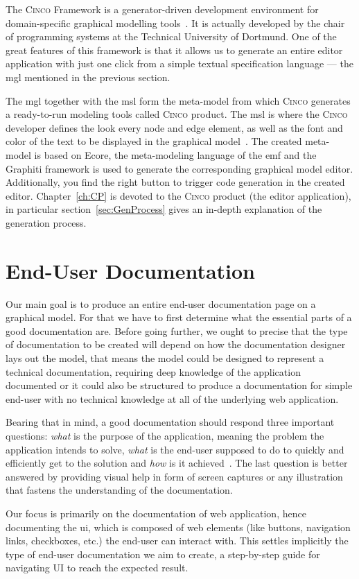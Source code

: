 The \textsc{Cinco} Framework is a generator-driven development environment for domain-specific graphical modelling tools~\cite{Cinco}. It is actually developed by the chair of programming systems at the Technical University of Dortmund. One of the great features of this framework is that it allows us to generate an entire editor application with just one click from a simple textual specification language --- the \acrfull{mgl} mentioned in the previous section. 

The \acrshort{mgl} together with the \acrshort{msl} form the meta-model from which \textsc{Cinco} generates a ready-to-run modeling tools called \textsc{Cinco} product. The \acrshort{msl} is where the \textsc{Cinco} developer defines the look every node and edge element, as well as the font and color of the text to be displayed in the graphical model~\cite{naujokat-diss}. The created meta-model is based on Ecore, the meta-modeling language of the \acrfull{emf} and the Graphiti framework is used to generate the corresponding graphical model editor. Additionally, you find the right button to trigger code generation in the created editor. Chapter~\ref{ch:CP} is devoted to the \textsc{Cinco} product (the editor application), in particular section~\ref{sec:GenProcess} gives an in-depth explanation of the generation process.



\section{End-User Documentation}\label{sec:endUserDoc}

Our main goal is to produce an entire end-user documentation page on a graphical model. For that we have to first determine what the essential parts of a good documentation are. Before going further, we ought to precise that the type of documentation to be created will depend on how the documentation designer lays out the model, that means the model could be designed to represent a technical documentation, requiring deep knowledge of the application documented or it could also be structured to produce a documentation for simple end-user with no technical knowledge at all of the underlying web application.

Bearing that in mind, a good documentation should respond three important questions: \textit{what} is the purpose of the application, meaning the problem the application intends to solve, \textit{what} is the end-user supposed to do to quickly and efficiently get to the solution and \textit{how} is it achieved~\cite{5712775}. The last question is better answered by providing visual help in form of screen captures or any illustration that fastens the understanding of the documentation.

Our focus is primarily on the documentation of web application, hence documenting the \acrfull{ui}, which is composed of web elements (like buttons, navigation links, checkboxes, etc.) the end-user can interact with. This settles implicitly the type of end-user documentation we aim to create, a step-by-step guide for navigating UI to reach the expected result. 
